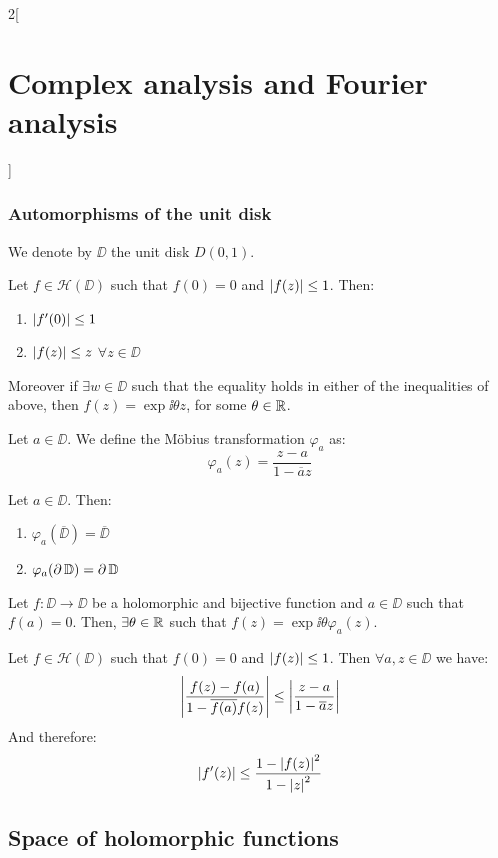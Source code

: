 \documentclass[../../../main.tex]{subfiles}
\begin{document}
\begin{multicols}{2}[\section{Complex analysis and Fourier analysis}]
  \subsubsection{Automorphisms of the unit disk}
  \begin{definition}
    We denote by $\DD$ the unit disk $D(0,1)$.
  \end{definition}
  \begin{lemma}
    Let $f\in\mathcal{H}(\DD)$ such that $f(0)=0$ and $\abs{f(z)}\leq 1$. Then:
    \begin{enumerate}
      \item $\abs{f'(0)}\leq 1$
      \item $\abs{f(z)}\leq z$ $\forall z\in \DD$
    \end{enumerate}
    Moreover if $\exists w\in \DD$ such that the equality holds in either of the inequalities of above, then $f(z)=\exp{\ii \theta} z$, for some $\theta\in\mathbb{R}$.
  \end{lemma}
  \begin{definition}
    Let $a\in \DD$. We define the Möbius transformation $\varphi_a$ as: $$\varphi_a(z)=\frac{z-a}{1-\overline{a}z}$$
  \end{definition}
  \begin{proposition}
    Let $a\in \DD$. Then:
    \begin{enumerate}
      \item $\varphi_a(\overline{\DD})=\overline{\DD}$
      \item $\varphi_a(\operatorname{\partial}{\mathbb{D}})=\operatorname{\partial}{\mathbb{D}}$
    \end{enumerate}
  \end{proposition}
  \begin{theorem}
    Let $f:\DD\rightarrow \DD$ be a holomorphic and bijective function and $a\in \DD$ such that $f(a)=0$. Then, $\exists\theta\in\mathbb{R}$ such that $f(z)=\exp{\ii \theta} \varphi_a(z)$.
  \end{theorem}
  \begin{lemma}
    Let $f\in\mathcal{H}(\DD)$ such that $f(0)=0$ and $\abs{f(z)}\leq 1$. Then $\forall a,z\in \DD$ we have:
    $$\abs{\frac{f(z)-f(a)}{1-\overline{f(a)}f(z)}}\leq\abs{\frac{z-a}{1-\overline{a}z}}$$
    And therefore: $$\abs{f'(z)}\leq\frac{1-{\abs{f(z)}}^2}{1-{\abs{z}}^2}$$
  \end{lemma}
  \subsection{Space of holomorphic functions}

\end{multicols}
\end{document}
